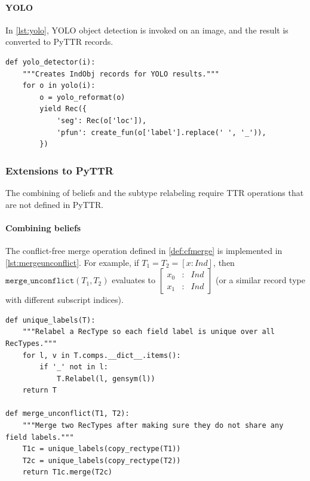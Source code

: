 \paragraph{YOLO}

In \autoref{lst:yolo}, YOLO object detection is invoked on an image, and the result is converted to PyTTR records.

\begin{lstlisting}[label=lst:yolo, caption=YOLO usage]
def yolo_detector(i):
    """Creates IndObj records for YOLO results."""
    for o in yolo(i):
        o = yolo_reformat(o)
        yield Rec({
            'seg': Rec(o['loc']),
            'pfun': create_fun(o['label'].replace(' ', '_')),
        })
\end{lstlisting}



\subsubsection{Extensions to PyTTR}

The combining of beliefs and the subtype relabeling require TTR operations that are not defined in PyTTR.

\paragraph{Combining beliefs}

The conflict-free merge operation defined in \autoref{def:cfmerge} is implemented in \autoref{lst:mergeunconflict}.
For example, if $T_1 = T_2 = [x:Ind]$, then $\mathtt{merge\_unconflict}(T_1, T_2)$ evaluates to $\left[\begin{array}{rcl} x_0&:&Ind \\ x_1&:&Ind \end{array}\right]$ (or a similar record type with different subscript indices).

\begin{lstlisting}[label={lst:mergeunconflict},caption={merge\_unconflict}]
def unique_labels(T):
    """Relabel a RecType so each field label is unique over all RecTypes."""
    for l, v in T.comps.__dict__.items():
        if '_' not in l:
            T.Relabel(l, gensym(l))
    return T

def merge_unconflict(T1, T2):
    """Merge two RecTypes after making sure they do not share any field labels."""
    T1c = unique_labels(copy_rectype(T1))
    T2c = unique_labels(copy_rectype(T2))
    return T1c.merge(T2c)
\end{lstlisting}

